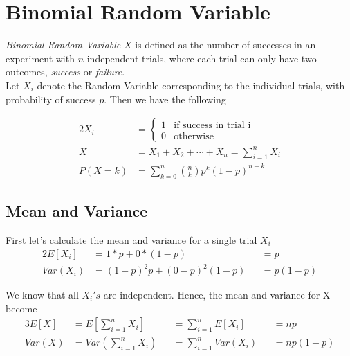 \documentclass[../../probability-notes.tex]{subfiles}
\begin{document}
    \section{Binomial Random Variable}
    \emph{Binomial Random Variable} $X$ is defined as the number of successes in an experiment with $n$ independent trials, where each trial can only have two outcomes, \emph{success} or \emph{failure}.\\
    Let $X_{i}$ denote the Random Variable corresponding to the individual trials, with probability of success $p$. Then we have the following

    \begin{alignat*}{2}
        X_{i} &= \begin{cases} 1 &\mbox{if success in trial i}\\ 
                                0 &\mbox{otherwise} \end{cases} \tag*{indicator variable} \\
        X &= X_{1} + X_{2} + \cdots + X_{n} = \sum_{i=1}^{n} X_{i} \\
        P(X=k) &= \sum_{k=0}^{n} \binom{n}{k} p^{k} (1 - p)^{n-k}
    \end{alignat*}

    \subsection{Mean and Variance}
    First let's calculate the mean and variance for a single trial $X_{i}$
    \begin{alignat*}{2}
        E[X_{i}] &= 1 * p + 0 * (1 - p) &&= p\\
        Var(X_{i}) &= (1 - p)^{2}p + (0-p)^{2}(1-p) &&= p(1-p)
    \end{alignat*}
    
    We know that all $X_{i}'s$ are independent. Hence, the mean and variance for X become
    \begin{alignat*}{3}
        E[X] &= E[\sum_{i=1}^{n} X_{i}] &&= \sum_{i=1}^{n}E[X_{i}] &&= np \\
        Var(X) &= Var(\sum_{i=1}^{n} X_{i}) &&= \sum_{i=1}^{n} Var(X_{i}) &&= np(1-p)
    \end{alignat*}
\end{document}
